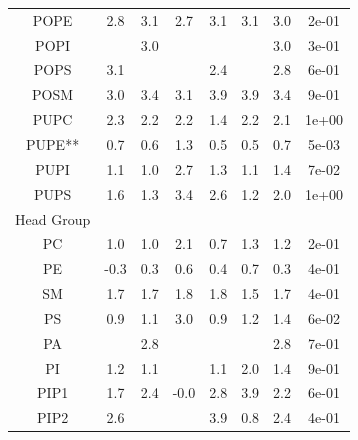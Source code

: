 \documentclass[9pt]{article}
\begin{document}
\begin{table}
{\begin{tabular}{| c || ccccc |cc|}
POPE    &               2.8 &               3.1 &                2.7 &                3.1 &                3.1 &  3.0 &  2e-01 \\
POPI    &                &               3.0 &                 &                 &                 &  3.0 &  3e-01 \\
POPS    &               3.1 &                &                 &                2.4 &                 &  2.8 &  6e-01 \\
POSM    &               3.0 &               3.4 &                3.1 &                3.9 &                3.9 &  3.4 &  9e-01 \\
PUPC    &               2.3 &               2.2 &                2.2 &                1.4 &                2.2 &  2.1 &  1e+00 \\
PUPE**    &               0.7 &               0.6 &                1.3 &                0.5 &                0.5 &  0.7 &  5e-03 \\
PUPI    &               1.1 &               1.0 &                2.7 &                1.3 &                1.1 &  1.4 &  7e-02 \\
PUPS    &               1.6 &               1.3 &                3.4 &                2.6 &                1.2 &  2.0 &  1e+00 \\
        \hline
Head Group &&&&&&&\\
PC      &               1.0 &               1.0 &                2.1 &                0.7 &                1.3 &  1.2  &  2e-01 \\
PE      &              -0.3 &               0.3 &                0.6 &                0.4 &                0.7 &  0.3 &  4e-01 \\
SM      &               1.7 &               1.7 &                1.8 &                1.8 &                1.5 &  1.7 &  4e-01 \\
PS      &               0.9 &               1.1 &                3.0 &                0.9 &                1.2 &  1.4 &  6e-02 \\
PA      &                &               2.8 &                 &                 &                 &  2.8 &  7e-01 \\
PI      &               1.2 &               1.1 &                 &                1.1 &                2.0 &  1.4 &  9e-01 \\
PIP1     &               1.7 &               2.4 &               -0.0 &                2.8 &                3.9 &  2.2 &  6e-01 \\
PIP2     &               2.6 &                &                 &                3.9 &                0.8 &  2.4 &  4e-01 \\

\end{tabular}}
\end{table}
\end{document}
